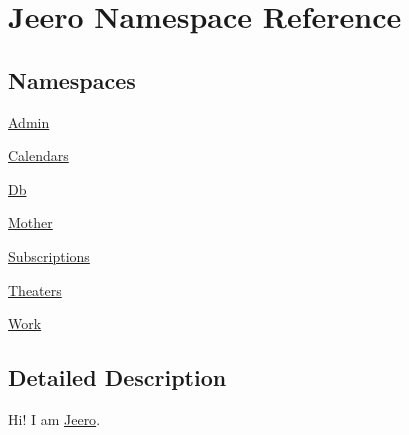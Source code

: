 \hypertarget{namespaceJeero}{}\section{Jeero Namespace Reference}
\label{namespaceJeero}
\subsection*{Namespaces}
\begin{DoxyCompactItemize}
\item 
 \hyperlink{namespaceJeero_1_1Admin}{Admin}
\item 
 \hyperlink{namespaceJeero_1_1Calendars}{Calendars}
\item 
 \hyperlink{namespaceJeero_1_1Db}{Db}
\item 
 \hyperlink{namespaceJeero_1_1Mother}{Mother}
\item 
 \hyperlink{namespaceJeero_1_1Subscriptions}{Subscriptions}
\item 
 \hyperlink{namespaceJeero_1_1Theaters}{Theaters}
\item 
 \hyperlink{namespaceJeero_1_1Work}{Work}
\end{DoxyCompactItemize}


\subsection{Detailed Description}
Hi! I am \hyperlink{namespaceJeero}{Jeero}. 